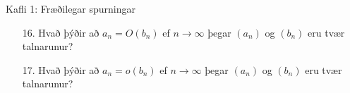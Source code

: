 \begin{frame}{Kafli 1: Fræðilegar spurningar}
  \begin{enumerate}
  \item[16.]  Hvað þýðir að $ a_n = O(b_n)$ ef $n\to \infty$ þegar
 $(a_n)$ og $(b_n)$ eru tvær talnarunur?
  \item[17.]  Hvað þýðir að $ a_n = o(b_n)$ ef $n\to \infty$ þegar
 $(a_n)$ og $(b_n)$ eru tvær talnarunur?
    \end{enumerate}
\end{frame}
%

